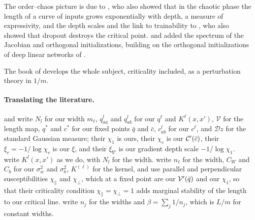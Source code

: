 \begin{refsection}
The order--chaos picture is due to \textcite{PooleEtAl2016}, who also showed that in the chaotic phase the length of a curve of inputs grows exponentially with depth, a measure of expressivity, and the depth scales and the link to trainability to \textcite{SchoenholzEtAl2017}, who also showed that dropout destroys the critical point. \Textcite{PenningtonEtAl2017} and \textcite{XiaoEtAl2018} added the spectrum of the Jacobian and orthogonal initializations, building on the orthogonal initializations of deep linear networks of \textcite{SaxeEtAl2014}.

The book of \textcite{RobertsEtAl2022} develops the whole subject, criticality included, as a perturbation theory in $1/m$.

\paragraph{Translating the literature.} \Textcite{PooleEtAl2016} and \textcite{SchoenholzEtAl2017} write $N_l$ for our width $m_\ell$, $q^l_{aa}$ and $q^l_{ab}$ for our $q^\ell$ and $K^\ell(x,x')$, $\mathcal V$ for the length map, $q^*$ and $c^*$ for our fixed points $\bar q$ and $\bar c$, $c^l_{ab}$ for our $c^\ell$, and $\mathcal Dz$ for the standard Gaussian measure; their $\chi_1$ is ours, their $\chi_c$ is our $\mathcal{C}'(\bar c)$, their $\xi_c=-1/\log\chi_c$ is our $\xi$, and their $\xi_\nabla$ is our gradient depth scale $-1/\log\chi_1$. \Textcite{LeeEtAl2018} write $K^l(x,x')$ as we do, with $N_l$ for the width. \Textcite{RobertsEtAl2022} write $n_\ell$ for the width, $C_W$ and $C_b$ for our $\sigma_w^2$ and $\sigma_b^2$, $K^{(\ell)}$ for the kernel, and use parallel and perpendicular susceptibilities $\chi_\parallel$ and $\chi_\perp$, which at a fixed point are our $\mathcal{V}'(\bar q)$ and our $\chi_1$, so that their criticality condition $\chi_\parallel=\chi_\perp=1$ adds marginal stability of the length to our critical line. \Textcite{HaninNica2020} write $n_j$ for the widths and $\beta=\sum_j1/n_j$, which is $L/m$ for constant widths.

\printchapterbib
\end{refsection}
